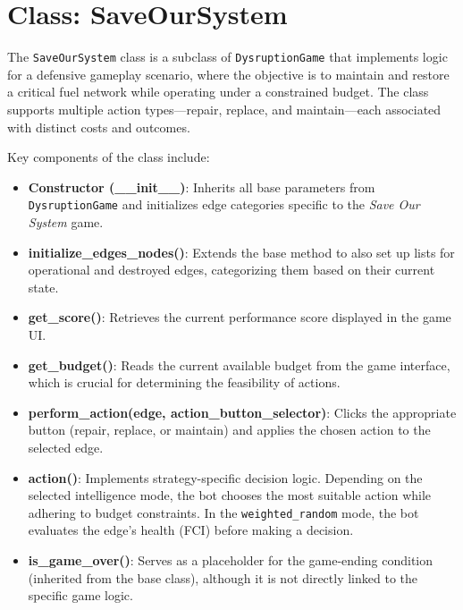 \documentclass[12pt,a4paper]{report}
\begin{document}
    \section*{Class: SaveOurSystem}
    \label{subsec:class-saveoursystem}

        The \texttt{SaveOurSystem} class is a subclass of \texttt{DysruptionGame} that implements logic for a defensive gameplay scenario, where the objective is to maintain and restore a critical fuel network while operating under a constrained budget. The class supports multiple action types—repair, replace, and maintain—each associated with distinct costs and outcomes.

        Key components of the class include:

        \begin{itemize}
            \item \textbf{Constructor (\_\_init\_\_)}: Inherits all base parameters from \texttt{DysruptionGame} and initializes edge categories specific to the \textit{Save Our System} game.

            \item \textbf{initialize\_edges\_nodes()}: Extends the base method to also set up lists for operational and destroyed edges, categorizing them based on their current state.

            \item \textbf{get\_score()}: Retrieves the current performance score displayed in the game UI.
            
            \item \textbf{get\_budget()}: Reads the current available budget from the game interface, which is crucial for determining the feasibility of actions.
            
            \item \textbf{perform\_action(edge, action\_button\_selector)}: Clicks the appropriate button (repair, replace, or maintain) and applies the chosen action to the selected edge.
            
            \item \textbf{action()}: Implements strategy-specific decision logic. Depending on the selected intelligence mode, the bot chooses the most suitable action while adhering to budget constraints. In the \texttt{weighted\_random} mode, the bot evaluates the edge's health (FCI) before making a decision.
            
            \item \textbf{is\_game\_over()}: Serves as a placeholder for the game-ending condition (inherited from the base class), although it is not directly linked to the specific game logic.
            

\end{itemize}
\end{document}
